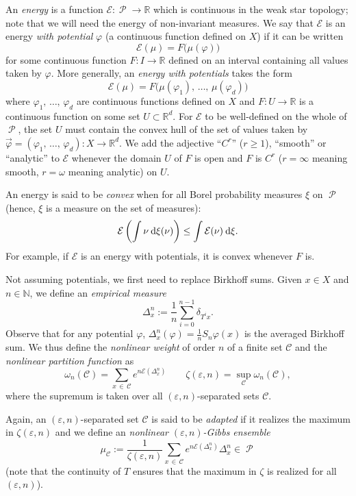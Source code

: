 \documentclass[10pt]{amsart}
\theoremstyle{definition}\newtheorem{defi}[theo]{Definition}\newtheorem{rema}[theo]{Remark}\newtheorem{exam}[theo]{Example}\newtheorem{exem}[theo]{Example}\newtheorem{nota}[theo]{Notation}
\theoremstyle{plain}
\theoremstyle{plain}
\newcommand\eps{\varepsilon}
\newcommand\Prob{{\operatorname{\mathscr{P}}}}
\newcommand*{\dd} {\relax\ifnum\lastnodetype>0\mskip\medmuskip\fi\mathrm{d}}
\newcommand{\pot}{\varphi}
\newcommand*\8{\infty}
\newcommand\NN{\mathbb{N}}
\newcommand\RR{\mathbb{R}}
\newcommand{\En}{\mathcal{E}}
\newcommand{\cC}{\mathcal C}
\begin{document}
An \emph{energy} is a function $\En : \Prob \to \RR$ which is continuous in the weak star topology; note that we will need the energy of non-invariant measures. We say that $\En$ is an energy \emph{with potential} $\pot$ (a continuous function defined on $X$) if it can be written
\[
\En(\mu) = F\big(\mu(\pot)\big)
\]
for some continuous function $F:I\to\RR$ defined on an interval containing all values taken by $\pot$. More generally, an \emph{energy with potentials} takes the form
\begin{equation}\label{eq-Energy}
\En(\mu) = F\big(\mu(\pot_1),\,\dots,\,\mu(\pot_d)\big)
\end{equation}
where $\pot_1,\,\dots,\,\pot_d$ are continuous functions defined on $X$ and $F:U\to\RR$ is a continuous function on some set $U\subset\RR^d$. For $\En$ to be well-defined on the whole of $\Prob$, the set $U$ must contain the convex hull of the set of values taken by $\vec\pot = (\pot_1,\,\dots,\,\pot_d):X\to\RR^d$. We add the adjective ``$C^r$'' ($r\ge 1$), ``smooth'' or ``analytic'' to $\En$ whenever the domain $U$ of $F$ is open and $F$ is $C^r$ ($r=\infty$ meaning smooth, $r=\omega$ meaning analytic) on $U$.

An energy is said to be \emph{convex} when for all Borel probability measures $\xi$ on $\Prob$ (hence, $\xi$ is a measure on the set of measures):
\[
\En\left(\int \nu \dd\xi(\nu) \right) \le \int \En(\nu) \dd\xi.
\]
For example, if $\En$ is an energy with potentials, it is convex whenever $F$ is.

Not assuming potentials, we first need to replace Birkhoff sums. Given $x\in X$ and $n\in\NN$, we define an \emph{empirical measure}
\[
\Delta_x^n := \frac1n \sum_{i=0}^{n-1} \delta_{T^ix}.
\]
Observe that for any potential $\pot$, $\Delta_x^n(\pot)=\frac1n S_n\pot(x)$ is the averaged Birkhoff sum. We thus define the \emph{nonlinear weight} of order $n$ of a finite set $\cC$ and the \emph{nonlinear partition function} as
\[
\omega_n(\cC) = \sum_{x\,\in\,\cC} e^{n\En(\Delta_x^n)} \qquad
\zeta(\eps,n) = \sup_{\cC} \omega_n(\cC),
\]
where the supremum is taken over all $(\eps,n)$-separated sets $\cC$.


Again, an $(\eps,n)$-separated set $\cC$ is said to be \emph{adapted} if it realizes the maximum in $\zeta(\eps,n)$ and we define an \emph{nonlinear $(\eps,n)$-Gibbs ensemble}
\begin{equation}\label{eq-def-ensemble}
\mu_{\cC} := \frac{1}{\zeta(\eps,n)} \sum_{x\,\in\,\cC} e^{n \En\left(\Delta_x^n\right)} \Delta_x^n \in\Prob
\end{equation}
(note that the continuity of $T$ ensures that the maximum in $\zeta$ is realized for all $(\eps,n)$).
\end{document}
